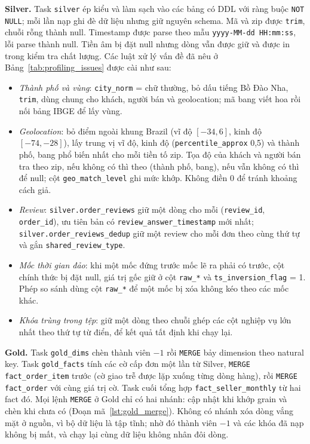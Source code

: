 \documentclass[a4paper]{article}
\begin{document}
\textbf{Silver.} Task \texttt{silver} ép kiểu và làm sạch vào các bảng có DDL với ràng buộc \texttt{NOT NULL}; mỗi lần nạp ghi đè dữ liệu nhưng giữ nguyên schema. Mã và zip được \texttt{trim}, chuỗi rỗng thành null. Timestamp được parse theo mẫu \texttt{yyyy-MM-dd HH:mm:ss}, lỗi parse thành null. Tiền âm bị đặt null nhưng dòng vẫn được giữ và được in trong kiểm tra chất lượng. Các luật xử lý vấn đề đã nêu ở Bảng~\ref{tab:profiling_issues} được cài như sau:
\begin{itemize}
  \item \textit{Thành phố và vùng}: \texttt{city\_\allowbreak{}norm} = chữ thường, bỏ dấu tiếng Bồ Đào Nha, \texttt{trim}, dùng chung cho khách, người bán và geolocation; mã bang viết hoa rồi nối bảng IBGE để lấy vùng.
  \item \textit{Geolocation}: bỏ điểm ngoài khung Brazil (vĩ độ $[-34, 6]$, kinh độ $[-74, -28]$), lấy trung vị vĩ độ, kinh độ (\texttt{percentile\_\allowbreak{}approx} 0,5) và thành phố, bang phổ biến nhất cho mỗi tiền tố zip. Tọa độ của khách và người bán tra theo zip, nếu không có thì theo (thành phố, bang), nếu vẫn không có thì để null; cột \texttt{geo\_\allowbreak{}match\_\allowbreak{}level} ghi mức khớp. Không điền 0 để tránh khoảng cách giả.
  \item \textit{Review}: \texttt{silver.order\_\allowbreak{}reviews} giữ một dòng cho mỗi (\texttt{review\_\allowbreak{}id}, \texttt{order\_\allowbreak{}id}), ưu tiên bản có \texttt{review\_\allowbreak{}answer\_\allowbreak{}timestamp} mới nhất; \texttt{silver.order\_\allowbreak{}reviews\_\allowbreak{}dedup} giữ một review cho mỗi đơn theo cùng thứ tự và gắn \texttt{shared\_\allowbreak{}review\_\allowbreak{}type}.
  \item \textit{Mốc thời gian đảo}: khi một mốc đứng trước mốc lẽ ra phải có trước, cột chính thức bị đặt null, giá trị gốc giữ ở cột \texttt{raw\_\allowbreak{}*} và \texttt{ts\_\allowbreak{}inversion\_\allowbreak{}flag} = 1. Phép so sánh dùng cột \texttt{raw\_\allowbreak{}*} để một mốc bị xóa không kéo theo các mốc khác.
  \item \textit{Khóa trùng trong tệp}: giữ một dòng theo chuỗi ghép các cột nghiệp vụ lớn nhất theo thứ tự từ điển, để kết quả tất định khi chạy lại.
\end{itemize}

\textbf{Gold.} Task \texttt{gold\_dims} chèn thành viên $-1$ rồi \texttt{MERGE} bảy dimension theo natural key. Task \texttt{gold\_facts} tính các cờ cấp đơn một lần từ Silver, \texttt{MERGE} \texttt{fact\_order\_item} trước (cờ giao trễ được lặp xuống từng dòng hàng), rồi \texttt{MERGE} \texttt{fact\_order} với cùng giá trị cờ. Task cuối tổng hợp \texttt{fact\_seller\_monthly} từ hai fact đó. Mọi lệnh \texttt{MERGE} ở Gold chỉ có hai nhánh: cập nhật khi khớp grain và chèn khi chưa có (Đoạn mã~\ref{lst:gold_merge}). Không có nhánh xóa dòng vắng mặt ở nguồn, vì bộ dữ liệu là tập tĩnh; nhờ đó thành viên $-1$ và các khóa đã nạp không bị mất, và chạy lại cùng dữ liệu không nhân đôi dòng.
\end{document}
